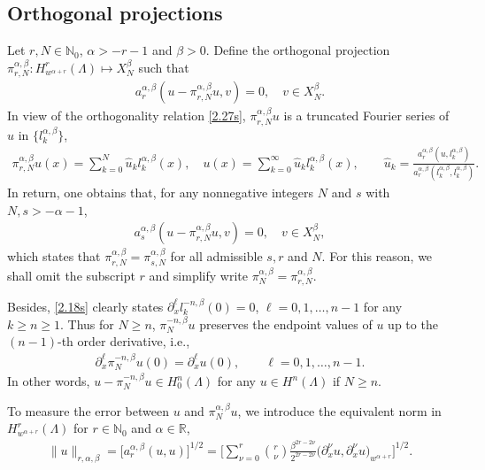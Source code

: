 \documentclass[10pt,reqno]{amsart}
\theoremstyle{remark}
\theoremstyle{definition}
\begin{document}
\subsection{Orthogonal projections}

Let  $r,N\in \mathbb{N}_0$, $\alpha>-r-1$ and $\beta>0$.
Define the orthogonal projection $\pi^{\alpha,\beta}_{r,N}: H^{r}_{w^{\alpha+r}}(\Lambda)\mapsto X^{\beta}_N$ such that
\begin{align}
\label{projection}
a^{\alpha,\beta}_{r}(u-\pi^{\alpha,\beta}_{r,N}u,v)= 0, \quad v\in X^{\beta}_N.
\end{align}
In view of the orthogonality relation \eqref{2.27s}, $\pi^{\alpha,\beta}_{r,N} u$ is a truncated Fourier series
of $u$
in $\{l^{\alpha,\beta}_k\}$,
\begin{align}
\label{truncated}
 \pi^{\alpha,\beta}_{r,N} u(x) = \sum_{k=0}^{N} \hat u_k l^{\alpha,\beta}_k(x),
\quad u(x) = \sum_{k=0}^{\infty} \hat u_k l^{\alpha,\beta}_k(x), \qquad
\hat u_k = \frac{a^{\alpha,\beta}_r(u, l^{\alpha,\beta}_k)}{a^{\alpha,\beta}_r(l^{\alpha,\beta}_k, l^{\alpha,\beta}_k)}.
\end{align}
In return, one obtains that,  for any nonnegative integers $N$ and $s$ with $N,s>-\alpha-1$,
\begin{align*}
a^{\alpha,\beta}_s(u-\pi^{\alpha,\beta}_{r,N}u,v) =0,\quad v\in X^{\beta}_N,
\end{align*}
which states that $\pi^{\alpha,\beta}_{r,N} = \pi^{\alpha,\beta}_{s,N} $ for all
 admissible $s,r$ and $N$. For this reason, we shall  omit the subscript $r$ and simplify write
$\pi^{\alpha,\beta}_{N}=\pi^{\alpha,\beta}_{r,N}$.

Besides,
 \eqref{2.18s} clearly states $\partial_x^{\ell} l^{-n,\beta}_k(0)=0$,  $\ell=0,1,\dots,n-1$ for any $k\ge n \ge 1$.
 Thus for $N\ge n$, $\pi_N^{-n,\beta}u$ preserves the endpoint values of  $u$ up to the $(n-1)$-th order derivative, i.e.,
\begin{align}
\label{endpointVal}
 \partial_x^{\ell}\pi_N^{-n,\beta}u(0) =  \partial_x^{\ell}  u(0), \qquad \ell=0,1,\dots,n-1.
 \end{align}
   In other words,  $u-\pi_N^{-n,\beta}u\in H^n_0(\Lambda)$  for any  $u\in H^n(\Lambda)$ if $N\ge n$.

To measure the error between $u$ and $\pi_N^{\alpha,\beta}u$, we introduce the equivalent norm in $H^r_{w^{\alpha+r}}(\Lambda)$
 for $r\in \mathbb{N}_0$ and $\alpha\in \mathbb{R}$,
\begin{align*}
\|u\|_{r,\alpha,\beta} = \big[a^{\alpha,\beta}_r(u,u)\big]^{1/2} =\Big[ \sum_{\nu=0}^{r} \binom{r}{\nu} \frac{\beta^{2r-2\nu}}{2^{2r-2\nu}}
\big(\partial_x^{\nu} u,  \partial_x^{\nu} u\big)_{w^{\alpha+r}} \Big]^{1/2}.
\end{align*}
\end{document}
